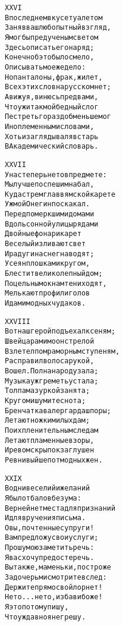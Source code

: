 \begin{minipage}[t]{\dimexpr 0.5\textwidth -\tabcolsep-.5pt}
\begin{alltt}\normalfont\centering
XXVI
В последнем вкусе туалетом
Заняв ваш любопытный взгляд,
Я мог бы пред ученым светом
Здесь описать его наряд;
Конечно б это было смело,
Описывать мое же дело:
Но панталоны, фрак, жилет,
Всех этих слов на русском нет;
А вижу я, винюсь пред вами,
Что уж и так мой бедный слог
Пестреть гораздо б меньше мог
Иноплеменными словами,
Хоть и заглядывал я встарь
В Академический словарь.
\end{alltt}
\end{minipage}
\clearpage

\begin{minipage}[t]{\dimexpr 0.5\textwidth -\tabcolsep-.5pt}
\begin{alltt}\normalfont\centering
XXVII
У нас теперь не то в предмете:
Мы лучше поспешим на бал,
Куда стремглав в ямской карете
Уж мой Онегин поскакал.
Перед померкшими домами
Вдоль сонной улицы рядами
Двойные фонари карет
Веселый изливают свет
И радуги на снег наводят;
Усеян плошками кругом,
Блестит великолепный дом;
По цельным окнам тени ходят,
Мелькают профили голов
И дам и модных чудаков.
\end{alltt}
\end{minipage}

\begin{minipage}[t]{\dimexpr 0.5\textwidth -\tabcolsep-.5pt}
\begin{alltt}\normalfont\centering
XXVIII
Вот наш герой подъехал к сеням;
Швейцара мимо он стрелой
Взлетел по мраморным ступеням,
Расправил волоса рукой,
Вошел. Полна народу зала;
Музыка уж греметь устала;
Толпа мазуркой занята;
Кругом и шум и теснота;
Бренчат кавалергарда шпоры;
Летают ножки милых дам;
По их пленительным следам
Летают пламенные взоры,
И ревом скрыпок заглушен
Ревнивый шепот модных жен.
\end{alltt}
\end{minipage}
\clearpage

\begin{minipage}[t]{\dimexpr 0.5\textwidth -\tabcolsep-.5pt}
\begin{alltt}\normalfont\centering
XXIX
Во дни веселий и желаний
Я был от балов без ума:
Верней нет места для признаний
И для вручения письма.
О вы, почтенные супруги!
Вам предложу свои услуги;
Прошу мою заметить речь:
Я вас хочу предостеречь.
Вы также, маменьки, построже
За дочерьми смотрите вслед:
Держите прямо свой лорнет!
Не то... не то, избави боже!
Я это потому пишу,
Что уж давно я не грешу.
\end{alltt}
\end{minipage}

